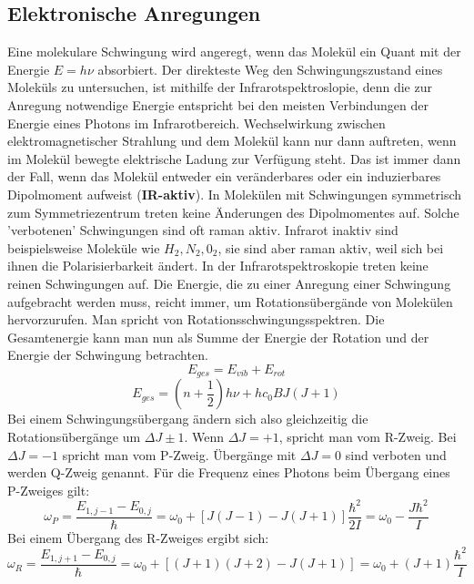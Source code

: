 \documentclass[11pt]{article}
\begin{document}
\subsection{Elektronische Anregungen}
Eine molekulare Schwingung wird angeregt, wenn das Molekül ein Quant mit der
Energie $E=h\nu$ absorbiert. Der direkteste Weg den Schwingungszustand eines
Moleküls zu untersuchen, ist mithilfe der Infrarotspektroslopie, denn die zur
Anregung notwendige Energie entspricht bei den meisten Verbindungen der Energie
eines Photons im Infrarotbereich. Wechselwirkung zwischen elektromagnetischer
Strahlung und dem Molekül kann nur dann auftreten, wenn im Molekül bewegte
elektrische Ladung zur Verfügung steht. Das ist immer dann der Fall, wenn das
Molekül entweder ein veränderbares oder ein induzierbares Dipolmoment aufweist
(\textbf{IR-aktiv}). In Molekülen mit Schwingungen symmetrisch zum
Symmetriezentrum treten keine Änderungen des Dipolmomentes auf. Solche
'verbotenen' Schwingungen sind oft raman aktiv. Infrarot inaktiv sind
beispielsweise Moleküle wie $H_2, N_2, 0_2$, sie sind aber raman aktiv, weil
sich bei ihnen die Polarisierbarkeit ändert.
In der Infrarotspektroskopie treten keine reinen Schwingungen auf. Die Energie,
die zu einer Anregung einer Schwingung aufgebracht werden muss, reicht immer,
um Rotationsübergände von Molekülen hervorzurufen. Man spricht von
Rotationsschwingungsspektren. Die Gesamtenergie kann man nun als Summe der
Energie der Rotation und der Energie der Schwingung betrachten.
\begin{equation}
  E_{ges}=E_{vib}+E_{rot}
\end{equation}
\begin{equation}
  E_{ges}=\left(n+\frac{1}{2}\right)h\nu+hc_0BJ(J+1)
\end{equation}
Bei einem Schwingungsübergang ändern sich also gleichzeitig die
Rotationsübergänge um $\Delta J\pm1$. Wenn $\Delta J=+1$, spricht man vom
R-Zweig. Bei $\Delta J=-1$ spricht man vom P-Zweig. Übergänge mit $\Delta J=0$
sind verboten und werden Q-Zweig genannt.
Für die Frequenz eines Photons beim Übergang eines P-Zweiges gilt:
\begin{equation}
  \omega_P=\frac{E_{1,j-1}-E_{0,j}}{\hbar}=\omega_0+
  [J(J-1)-J(J+1)]\frac{\hbar^2}{2I}=\omega_0-\frac{J\hbar^2}{I}
\end{equation}
Bei einem Übergang des R-Zweiges ergibt sich:
\begin{equation}
  \omega_R=\frac{E_{1,j+1}-E_{0,j}}{\hbar}=\omega_0+[(J+1)(J+2)-J(J+1)]=
  \omega_0+(J+1)\frac{\hbar^2}{I}
\end{equation}
\end{document}
